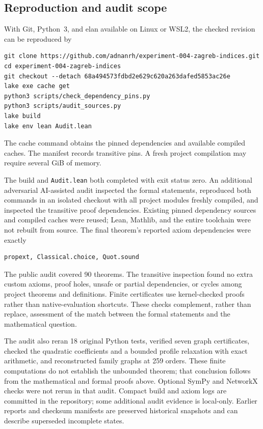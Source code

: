 \documentclass[11pt]{amsart}
\theoremstyle{definition}
\theoremstyle{remark}
\begin{document}
\newpage
\subsection{Reproduction and audit scope}
With Git, Python~3, and elan available on Linux or WSL2, the checked revision can be reproduced by
\begin{verbatim}
git clone https://github.com/adnanrh/experiment-004-zagreb-indices.git
cd experiment-004-zagreb-indices
git checkout --detach 68a494573fdbd2e629c620a263dafed5853ac26e
lake exe cache get
python3 scripts/check_dependency_pins.py
python3 scripts/audit_sources.py
lake build
lake env lean Audit.lean
\end{verbatim}
The cache command obtains the pinned dependencies and available compiled caches. The manifest records transitive pins. A fresh project compilation may require several GiB of memory.

The build and \texttt{Audit.lean} both completed with exit status zero. An additional adversarial AI-assisted audit inspected the formal statements, reproduced both commands in an isolated checkout with all project modules freshly compiled, and inspected the transitive proof dependencies. Existing pinned dependency sources and compiled caches were reused; Lean, Mathlib, and the entire toolchain were not rebuilt from source. The final theorem's reported axiom dependencies were exactly
\begin{verbatim}
propext, Classical.choice, Quot.sound
\end{verbatim}
The public audit covered 90 theorems. The transitive inspection found no extra custom axioms, proof holes, unsafe or partial dependencies, or cycles among project theorems and definitions. Finite certificates use kernel-checked proofs rather than native-evaluation shortcuts. These checks complement, rather than replace, assessment of the match between the formal statements and the mathematical question.

The audit also reran 18 original Python tests, verified seven graph certificates, checked the quadratic coefficients and a bounded profile relaxation with exact arithmetic, and reconstructed family graphs at 259 orders. These finite computations do not establish the unbounded theorem; that conclusion follows from the mathematical and formal proofs above. Optional SymPy and NetworkX checks were not rerun in that audit. Compact build and axiom logs are committed in the repository; some additional audit evidence is local-only. Earlier reports and checksum manifests are preserved historical snapshots and can describe superseded incomplete states.
\end{document}
